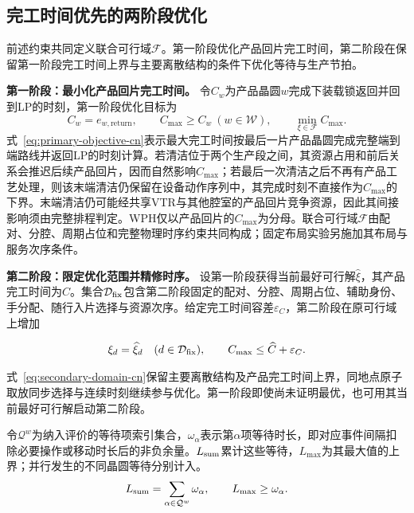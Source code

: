 \documentclass[final,5p,times,twocolumn]{elsarticle}
\begin{document}
\subsection{完工时间优先的两阶段优化}
\label{sec:model-objective-cn}

前述约束共同定义联合可行域$\mathcal F$。第一阶段优化产品回片完工时间，第二阶段在保留第一阶段完工时间上界与主要离散结构的条件下优化等待与生产节拍。

\noindent\textbf{第一阶段：最小化产品回片完工时间。}
令$C_w$为产品晶圆$w$完成下装载锁返回并回到LP的时刻，第一阶段优化目标为
\begin{equation}
C_w=e_{w,\mathrm{return}},\qquad
C_{\max}\ge C_w\ (w\in\mathcal W),\qquad
\min_{\xi\in\mathcal F}C_{\max}.
\label{eq:primary-objective-cn}
\end{equation}
式~\eqref{eq:primary-objective-cn}表示最大完工时间按最后一片产品晶圆完成完整端到端路线并返回LP的时刻计算。若清洁位于两个生产段之间，其资源占用和前后关系会推迟后续产品回片，因而自然影响$C_{\max}$；若最后一次清洁之后不再有产品工艺处理，则该末端清洁仍保留在设备动作序列中，其完成时刻不直接作为$C_{\max}$的下界。末端清洁仍可能经共享VTR与其他腔室的产品回片竞争资源，因此其间接影响须由完整排程判定。WPH仅以产品回片的$C_{\max}$为分母。联合可行域$\mathcal F$由配对、分腔、周期占位和完整物理时序约束共同构成；固定布局实验另施加其布局与服务次序条件。

\noindent\textbf{第二阶段：限定优化范围并精修时序。}
设第一阶段获得当前最好可行解$\widehat\xi$，其产品完工时间为$\widehat C$。集合$\mathcal D_{\rm fix}$包含第二阶段固定的配对、分腔、周期占位、辅助身份、手分配、随行入片选择与资源次序。给定完工时间容差$\varepsilon_C$，第二阶段在原可行域上增加

\begin{equation}
\begin{gathered}
\xi_d=\widehat\xi_d\quad(d\in\mathcal D_{\rm fix}),\qquad
C_{\max}\le\widehat C+\varepsilon_C.
\end{gathered}
\label{eq:secondary-domain-cn}
\end{equation}

式~\eqref{eq:secondary-domain-cn}保留主要离散结构及产品完工时间上界，同地点原子取放同步选择与连续时刻继续参与优化。第一阶段即使尚未证明最优，也可用其当前最好可行解启动第二阶段。

令$\mathcal Q^w$为纳入评价的等待项索引集合，$\omega_\alpha$表示第$\alpha$项等待时长，即对应事件间隔扣除必要操作或移动时长后的非负余量。$L_{\rm sum}$累计这些等待，$L_{\max}$为其最大值的上界；并行发生的不同晶圆等待分别计入。
\begin{equation}
\begin{gathered}
L_{\rm sum}=\sum_{\alpha\in\mathcal Q^w}\omega_\alpha,\qquad
L_{\max}\ge\omega_\alpha.
\end{gathered}
\label{eq:secondary-wait-cn}
\end{equation}
\end{document}
